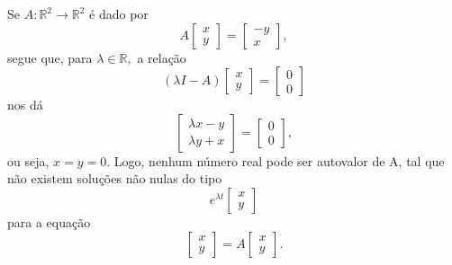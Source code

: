 \documentclass[../functional_analysis.tex]{subfiles}
\begin{document}
Se \(A:\mathbb{R}^{2}\rightarrow \mathbb{R}^{2}\) é dado por
\[
	A \begin{bmatrix}
		x \\
		y
	\end{bmatrix} = \begin{bmatrix}
		-y \\
		x
	\end{bmatrix},
\]
segue que, para \(\lambda \in \mathbb{R},\) a relação
\[
	(\lambda I - A)\begin{bmatrix}
		x \\
		y
	\end{bmatrix} = \begin{bmatrix}
		0 \\
		0
	\end{bmatrix}
\]
nos dá
\[
	\begin{bmatrix}
		\lambda x - y \\
		\lambda y + x
	\end{bmatrix} = \begin{bmatrix}
		0 \\
		0
	\end{bmatrix},
\]
ou seja, \(x=y=0.\) Logo, nenhum número real pode ser autovalor de A, tal que não existem soluções não nulas do tipo
\[
	e^{\lambda t}\begin{bmatrix}
		x \\
		y
	\end{bmatrix}
\]
para a equação
\[
	\begin{bmatrix}
		x \\
		y
	\end{bmatrix} = A\begin{bmatrix}
		x \\
		y
	\end{bmatrix}.
\]
\end{document}
